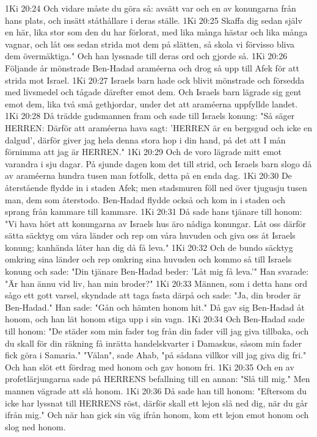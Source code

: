 1Ki 20:24  Och vidare måste du göra så: avsätt var och en av konungarna från hans plats, och insätt ståthållare i deras ställe.
1Ki 20:25  Skaffa dig sedan själv en här, lika stor som den du har förlorat, med lika många hästar och lika många vagnar, och låt oss sedan strida mot dem på slätten, så skola vi förvisso bliva dem övermäktiga." Och han lyssnade till deras ord och gjorde så.
1Ki 20:26  Följande år mönstrade Ben-Hadad araméerna och drog så upp till Afek för att strida mot Israel.
1Ki 20:27  Israels barn hade ock blivit mönstrade och försedda med livsmedel och tågade därefter emot dem. Och Israels barn lägrade sig gent emot dem, lika två små gethjordar, under det att araméerna uppfyllde landet.
1Ki 20:28  Då trädde gudsmannen fram och sade till Israels konung: "Så säger HERREN: Därför att araméerna hava sagt: 'HERREN är en bergsgud och icke en dalgud', därför giver jag hela denna stora hop i din hand, på det att I mån förnimma att jag är HERREN."
1Ki 20:29  Och de voro lägrade mitt emot varandra i sju dagar. På sjunde dagen kom det till strid, och Israels barn slogo då av araméerna hundra tusen man fotfolk, detta på en enda dag.
1Ki 20:30  De återstående flydde in i staden Afek; men stadsmuren föll ned över tjugusju tusen man, dem som återstodo. Ben-Hadad flydde också och kom in i staden och sprang från kammare till kammare.
1Ki 20:31  Då sade hans tjänare till honom: "Vi hava hört att konungarna av Israels hus äro nådiga konungar. Låt oss därför sätta säcktyg om våra länder och rep om våra huvuden och giva oss åt Israels konung; kanhända låter han dig då få leva."
1Ki 20:32  Och de bundo säcktyg omkring sina länder och rep omkring sina huvuden och kommo så till Israels konung och sade: "Din tjänare Ben-Hadad beder: 'Låt mig få leva.'" Han svarade: "Är han ännu vid liv, han min broder?"
1Ki 20:33  Männen, som i detta hans ord sågo ett gott varsel, skyndade att taga fasta därpå och sade: "Ja, din broder är Ben-Hadad." Han sade: "Gån och hämten honom hit." Då gav sig Ben-Hadad åt honom, och han lät honom stiga upp i sin vagn.
1Ki 20:34  Och Ben-Hadad sade till honom: "De städer som min fader tog från din fader vill jag giva tillbaka, och du skall för din räkning få inrätta handelskvarter i Damaskus, såsom min fader fick göra i Samaria." "Välan", sade Ahab, "på sådana villkor vill jag giva dig fri." Och han slöt ett fördrag med honom och gav honom fri.
1Ki 20:35  Och en av profetlärjungarna sade på HERRENS befallning till en annan: "Slå till mig." Men mannen vägrade att slå honom.
1Ki 20:36  Då sade han till honom: "Eftersom du icke har lyssnat till HERRENS röst, därför skall ett lejon slå ned dig, när du går ifrån mig." Och när han gick sin väg ifrån honom, kom ett lejon emot honom och slog ned honom.
